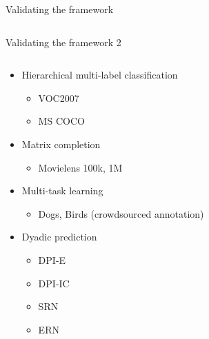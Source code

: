 \documentclass[]{beamer}
\begin{document}
\begin{frame}{Validating the framework}
\begin{columns}
\begin{column}{0.6\textwidth}
\end{column}

\end{columns}

\end{frame}


\begin{frame}{Validating the framework 2}

\begin{columns}

\begin{column}{0.4\textwidth}

\begin{itemize}
\item Hierarchical multi-label classification
\begin{itemize}
    \item VOC2007
    \item MS COCO
\end{itemize}

\item Matrix completion
\begin{itemize}
    \item Movielens 100k, 1M
\end{itemize}

\item Multi-task learning
\begin{itemize}
    \item Dogs, Birds (crowdsourced annotation)
\end{itemize}

\item Dyadic prediction
\begin{itemize}
    \item DPI-E
    \item DPI-IC
    \item SRN
    \item ERN
\end{itemize}

\end{itemize}
\end{column}

\begin{column}{0.6\textwidth}

\vspace{55mm}

\begin{table}[]
\centering
\end{table}
\end{column}
\end{columns}
\end{frame}
\end{document}

